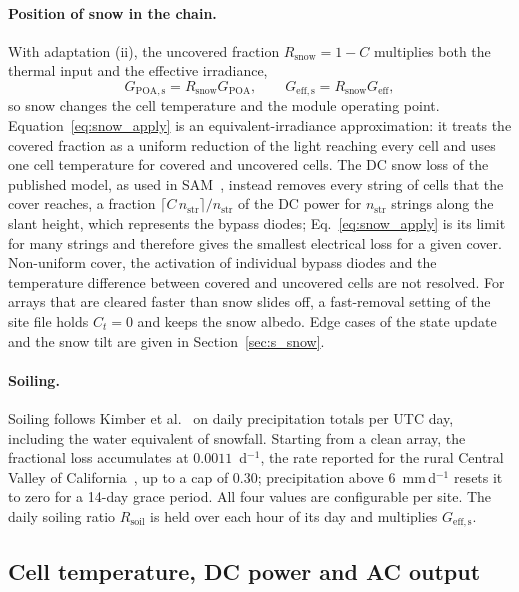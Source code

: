 \documentclass[11pt]{article}
\begin{document}
\paragraph{Position of snow in the chain.}
With adaptation (ii), the uncovered fraction $R_{\mathrm{snow}}=1-C$ multiplies both the thermal input and the effective irradiance,
\begin{equation}
G_{\mathrm{POA,s}}=R_{\mathrm{snow}}G_{\mathrm{POA}},\qquad G_{\mathrm{eff,s}}=R_{\mathrm{snow}}G_{\mathrm{eff}},
\label{eq:snow_apply}
\end{equation}
so snow changes the cell temperature and the module operating point. Equation~\ref{eq:snow_apply} is an equivalent-irradiance approximation: it treats the covered fraction as a uniform reduction of the light reaching every cell and uses one cell temperature for covered and uncovered cells. The DC snow loss of the published model, as used in SAM~\cite{gilmanSAMPhotovoltaicModel2018}, instead removes every string of cells that the cover reaches, a fraction $\lceil C\,n_{\mathrm{str}}\rceil/n_{\mathrm{str}}$ of the DC power for $n_{\mathrm{str}}$ strings along the slant height, which represents the bypass diodes; Eq.~\ref{eq:snow_apply} is its limit for many strings and therefore gives the smallest electrical loss for a given cover. Non-uniform cover, the activation of individual bypass diodes and the temperature difference between covered and uncovered cells are not resolved. For arrays that are cleared faster than snow slides off, a fast-removal setting of the site file holds $C_t=0$ and keeps the snow albedo. Edge cases of the state update and the snow tilt are given in Section~\ref{sec:s_snow}.

\paragraph{Soiling.}
Soiling follows Kimber et al.~\cite{kimber2006} on daily precipitation totals per UTC day, including the water equivalent of snowfall. Starting from a clean array, the fractional loss accumulates at $0.0011$~d$^{-1}$, the rate reported for the rural Central Valley of California~\cite{kimber2006}, up to a cap of $0.30$; precipitation above 6~mm\,d$^{-1}$ resets it to zero for a 14-day grace period. All four values are configurable per site. The daily soiling ratio $R_{\mathrm{soil}}$ is held over each hour of its day and multiplies $G_{\mathrm{eff,s}}$.

\subsection{Cell temperature, DC power and AC output}
\label{sec:thermal}
\end{document}
